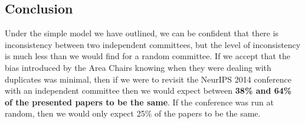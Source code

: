 \begin{Shaded}
\begin{Highlighting}[]
\NormalTok{ [}\NormalTok{, }\NormalTok{, }\NormalTok{]:}
\OperatorTok{=}\NormalTok{ []}
     \NormalTok{(}\NormalTok{):}
\OperatorTok{=}
\OperatorTok{+}\NormalTok{joindf.loc[ind][}\NormalTok{])))}
\OperatorTok{=}
\OperatorTok{=}
\OperatorTok{=} \OperatorTok{*}
    \NormalTok{(}\OperatorTok{=}\NormalTok{, }\NormalTok{)))}
    \NormalTok{(}\StringTok{ +/{-} }\OperatorTok{=}\OperatorTok{=}
\end{Highlighting}
\end{Shaded}

\hypertarget{conclusion}{%
\subsection{Conclusion}\label{conclusion}}

\begin{flushright}
\end{flushright}

Under the simple model we have outlined, we can be confident that there
is inconsistency between two independent committees, but the level of
inconsistency is much less than we would find for a random committee. If
we accept that the bias introduced by the Area Chairs knowing when they
were dealing with duplicates was minimal, then if we were to revisit the
NeurIPS 2014 conference with an independent committee then we would expect
between \textbf{38\% and 64\% of the presented papers to be the same}.
If the conference was run at random, then we would only expect 25\% of
the papers to be the same.

